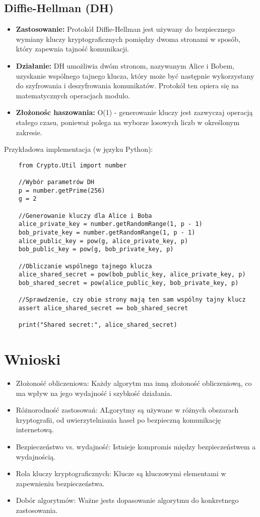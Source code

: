 \documentclass[options]{article}
\begin{document}
\subsection*{Diffie-Hellman (DH)}
\begin{itemize}
    \item \textbf{Zastosowanie:} Protokół Diffie-Hellman jest używany do bezpiecznego wymiany kluczy kryptograficznych pomiędzy dwoma stronami w sposób, który zapewnia tajność komunikacji.
    \item \textbf{Działanie:} DH umożliwia dwóm stronom, nazywanym Alice i Bobem, uzyskanie wspólnego tajnego klucza, który może być następnie wykorzystany do szyfrowania i deszyfrowania komunikatów. Protokół ten opiera się na matematycznych operacjach modulo.
    \item \textbf{Złożonośc haszowania:} O(1) - generowanie kluczy jest zazwyczaj operacją stałego czasu, ponieważ polega na wyborze losowych liczb w określonym zakresie.

\end{itemize}
Przykładowa implementacja (w języku Python):
\begin{verbatim}
    from Crypto.Util import number

    //Wybór parametrów DH
    p = number.getPrime(256)
    g = 2

    //Generowanie kluczy dla Alice i Boba
    alice_private_key = number.getRandomRange(1, p - 1)
    bob_private_key = number.getRandomRange(1, p - 1)
    alice_public_key = pow(g, alice_private_key, p)
    bob_public_key = pow(g, bob_private_key, p)

    //Obliczanie wspólnego tajnego klucza
    alice_shared_secret = pow(bob_public_key, alice_private_key, p)
    bob_shared_secret = pow(alice_public_key, bob_private_key, p)

    //Sprawdzenie, czy obie strony mają ten sam wspólny tajny klucz
    assert alice_shared_secret == bob_shared_secret

    print("Shared secret:", alice_shared_secret)
\end{verbatim}

\section*{Wnioski}

\begin{itemize}
    \item Złożoność obliczeniowa: Każdy algorytm ma inną złożoność obliczeniową, co ma wpływ na jego wydajność i szybkość działania.
    \item Różnorodność zastosowań: ALgorytmy są używane w różnych obszarach kryptografii, od uwierzytelniania haseł po bezpieczną komunikację internetową.
    \item Bezpieczeństwo vs. wydajność: Istnieje kompromis między bezpieczeństwem a wydajnością.
    \item Rola kluczy kryptograficznych: Klucze są kluczowymi elementami w zapewnieniu bezpieczeństwa.
    \item Dobór algorytmów: Ważne jests dopasowanie algorytmu do konkretnego zastosowania.
\end{itemize}
\end{document}

